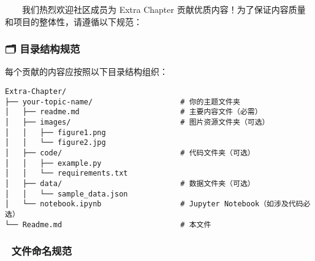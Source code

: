 \documentclass[
]{article}
\begin{document}
  我们热烈欢迎社区成员为 Extra Chapter
贡献优质内容！为了保证内容质量和项目的整体性，请遵循以下规范：

\subsubsection{🗂️
目录结构规范}\label{ux76eeux5f55ux7ed3ux6784ux89c4ux8303}

每个贡献的内容应按照以下目录结构组织：

\begin{verbatim}
Extra-Chapter/
├── your-topic-name/                    # 你的主题文件夹
│   ├── readme.md                       # 主要内容文件（必需）
│   ├── images/                         # 图片资源文件夹（可选）
│   │   ├── figure1.png
│   │   └── figure2.jpg
│   ├── code/                           # 代码文件夹（可选）
│   │   ├── example.py
│   │   └── requirements.txt
│   ├── data/                           # 数据文件夹（可选）
│   │   └── sample_data.json
│   └── notebook.ipynb                  # Jupyter Notebook（如涉及代码必选）
└── Readme.md                           # 本文件
\end{verbatim}

\subsubsection{📝
文件命名规范}\label{ux6587ux4ef6ux547dux540dux89c4ux8303}
\end{document}
